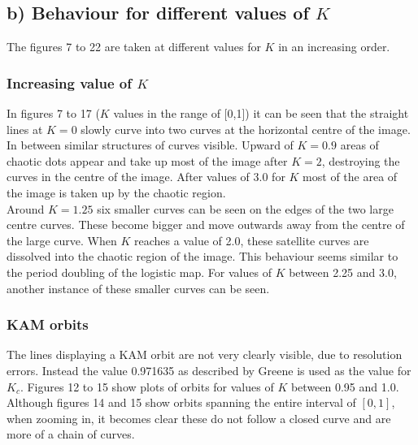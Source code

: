 \documentclass[a4paper,11pt]{article}
\begin{document}
\subsection*{b) Behaviour for different values of $K$}

The figures 7 to 22 are taken at different values for $K$ in an increasing order.

\subsubsection*{Increasing value of $K$}
In figures 7 to 17 ($K$ values in the range of [0,1]) it can be seen that the straight lines at $K = 0$ slowly curve into two curves at the horizontal centre of the image. In between similar structures of curves visible.
Upward of $K = 0.9$ areas of chaotic dots appear and take up most of the image after $K = 2$, destroying the curves in the centre of the image.
After values of 3.0 for $K$ most of the area of the image is taken up by the chaotic region.\\
Around $K = 1.25$ six smaller curves can be seen on the edges of the two large centre curves. These become bigger and move outwards away from the centre of the large curve. When $K$ reaches a value of 2.0, these satellite curves are dissolved into the chaotic region of the image. This behaviour seems similar to the period doubling of the logistic map. For values of $K$ between 2.25 and 3.0, another instance of these smaller curves can be seen.

\subsubsection*{KAM orbits}
The lines displaying a KAM orbit are not very clearly visible, due to resolution errors. Instead the value 0.971635 as described by Greene\cite{kval} is used as the value for $K_c$. Figures 12 to 15 show plots of orbits for values of $K$ between 0.95 and 1.0. Although figures 14 and 15 show orbits spanning the entire interval of $[0,1]$, when zooming in, it becomes clear these do not follow a closed curve and are more of a chain of curves.
\end{document}
